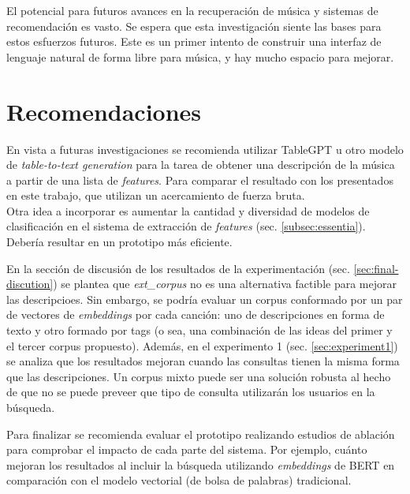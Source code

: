 El potencial para futuros avances en la recuperación de música y sistemas de recomendación es vasto. Se espera que esta investigación siente las bases para estos esfuerzos futuros. Este es un primer intento de construir una interfaz de lenguaje natural de forma libre para música, y hay mucho espacio para mejorar.

\chapter*{Recomendaciones}
\label{chap:recommendations}

En vista a futuras investigaciones se recomienda utilizar TableGPT \cite{Gong2020TableGPTFT} u otro modelo de \textit{table-to-text generation} para la tarea de obtener una descripción de la música a partir de una lista de \textit{features}. Para comparar el resultado con los presentados en este trabajo, que utilizan un acercamiento de fuerza bruta. \\
Otra idea a incorporar es aumentar la cantidad y diversidad de modelos de clasificación en el sistema de extracción de \textit{features} (sec. \ref{subsec:essentia}). Debería resultar en un prototipo más eficiente.

En la sección de discusión de los resultados de la experimentación (sec. \ref{sec:final-discution}) se plantea que \textit{ext\_corpus} no es una alternativa factible para mejorar las descripcioes. Sin embargo, se podría evaluar un corpus conformado por un par de vectores de \textit{embeddings} por cada canción: uno de descripciones en forma de texto y otro formado por tags (o sea, una combinación de las ideas del primer y el tercer corpus propuesto). Además, en el experimento 1 (sec. \ref{sec:experiment1}) se analiza que los resultados mejoran cuando las consultas tienen la misma forma que las descripciones. Un corpus mixto puede ser una solución robusta al hecho de que no se puede preveer que tipo de consulta utilizarán los usuarios en la búsqueda.

Para finalizar se recomienda evaluar el prototipo realizando estudios de ablación para comprobar el impacto de cada parte del sistema. Por ejemplo, cuánto mejoran los resultados al incluir la búsqueda utilizando \textit{embeddings} de BERT en comparación con el modelo vectorial (de bolsa de palabras) tradicional.
